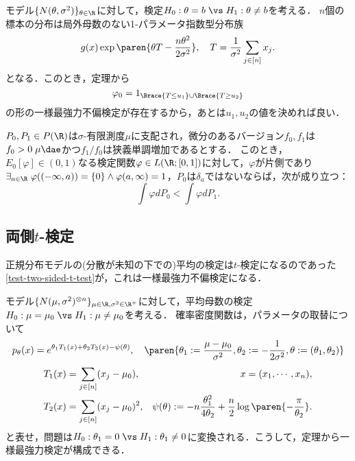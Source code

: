 \documentclass[uplatex,dvipdfmx]{jsreport}
\begin{document}
\begin{example}
    モデル$\{N(\theta,\sigma^2)\}_{\theta\in\R}$に対して，検定$H_0:\theta=b\;\vs\;H_1:\theta\ne b$を考える．
    $n$個の標本の分布は局外母数のない1-パラメータ指数型分布族
    \[g(x)\exp\paren{\theta T-\frac{n\theta^2}{2\sigma^2}},\quad T=\frac{1}{\sigma^2}\sum_{j\in[n]}x_j.\]
    となる．このとき，定理から
    \[\varphi_0=1_{\Brace{T\le u_1}\cup\Brace{T\ge u_2}}\]
    の形の一様最強力不偏検定が存在するから，あとは$u_1,u_2$の値を決めれば良い．
\end{example}

\begin{lemma}[不偏にならない場合]
    $P_0,P_1\in P(\R)$は$\sigma$-有限測度$\mu$に支配され，微分のあるバージョン$f_0,f_1$は$f_0>0\;\mu\dae$かつ$f_1/f_0$は狭義単調増加であるとする．
    このとき，$E_0[\varphi]\in(0,1)$なる検定関数$\varphi\in L(\R;[0,1])$に対して，$\varphi$が片側であり$\exists_{a\in\R}\;\varphi((-\infty,a))=\{0\}\land\varphi(a,\infty)=1$，$P_0$は$\delta_a$ではないならば，次が成り立つ：
    \[\int\varphi dP_0<\int\varphi dP_1.\]
\end{lemma}

\subsection{両側$t$-検定}

\begin{tcolorbox}[colframe=ForestGreen, colback=ForestGreen!10!white,breakable,colbacktitle=ForestGreen!40!white,coltitle=black,fonttitle=\bfseries\sffamily,
title=]
    正規分布モデルの(分散が未知の下での)平均の検定は$t$-検定になるのであった\ref{test-two-sided-t-test}が，これは一様最強力不偏検定になる．
\end{tcolorbox}

\begin{problem}
    モデル$\{N(\mu,\sigma^2)^{\otimes n}\}_{\mu\in\R,\sigma^2\in\R^+}$に対して，平均母数の検定$H_0:\mu=\mu_0\;\vs\;H_1:\mu\ne\mu_0$を考える．
    確率密度関数は，パラメータの取替について
    \[p_\theta(x)=e^{\theta_1T_1(x)+\theta_2T_2(x)-\psi(\theta)},\quad\paren{\theta_1:=\frac{\mu-\mu_0}{\sigma^2},\theta_2:=-\frac{1}{2\sigma^2},\theta:=(\theta_1,\theta_2)}\]
    \begin{align*}
        T_1(x)&=\sum_{j\in[n]}(x_j-\mu_0),&x=(x_1,\cdots,x_n),\\
        T_2(x)&=\sum_{j\in[n]}(x_j-\mu_0)^2,&\psi(\theta):=-n\frac{\theta^2_1}{4\theta_2}+\frac{n}{2}\log\paren{-\frac{\pi}{\theta_2}}.
    \end{align*}
    と表せ，問題は$H_0:\theta_1=0\;\vs\;H_1:\theta_1\ne0$に変換される．こうして，定理から一様最強力検定が構成できる．
\end{problem}
\end{document}
